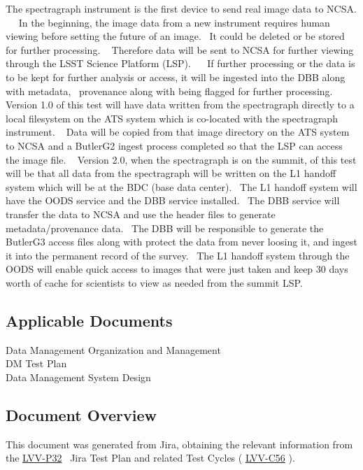 \documentclass[DM,lsstdraft,STR,toc]{lsstdoc}
\begin{document}
The spectragraph instrument is the first device to send real image data
to NCSA. ~ ~In the beginning, the image data from a new instrument
requires human viewing before setting the future of an image. ~It could
be deleted or be stored for further processing. ~ Therefore data will be
sent to NCSA for further viewing through the LSST Science Platform
(LSP). ~ ~If further processing or the data is to be kept for further
analysis or access, it will be ingested into the DBB along with
metadata, ~provenance along with being flagged for further processing. ~
Version 1.0 of this test will have data written from the spectragraph
directly to a local filesystem on the ATS system which is co-located
with the spectragraph instrument. ~ Data will be copied from that image
directory on the ATS system to NCSA and a ButlerG2 ingest process
completed so that the LSP can access the image file. ~ Version 2.0, when
the spectragraph is on the summit, of this test will be that all data
from the spectragraph will be written on the L1 handoff system which
will be at the BDC (base data center). ~The L1 handoff system will have
the OODS service and the DBB service installed. ~The DBB service will
transfer the data to NCSA and use the header files to generate
metadata/provenance data. ~The DBB will be responsible to generate the
ButlerG3 access files along with protect the data from never loosing it,
and ingest it into the permanent record of the survey. ~The L1 handoff
system through the OODS will enable quick access to images that were
just taken and keep 30 days worth of cache for scientists to view as
needed from the summit LSP. ~\\[2\baselineskip]

\subsection{Applicable Documents}\label{applicable-documents}

 Data Management Organization and Management\\
 DM Test Plan\\
 Data Management System Design


\subsection{Document Overview}
\label{sect:docoverview}

This document was generated from Jira, obtaining the relevant information from the 
\href{https://jira.lsstcorp.org/secure/Tests.jspa#/testPlan/LVV-P32}{LVV-P32}
~Jira Test Plan and related Test Cycles (
  \href{https://jira.lsstcorp.org/secure/Tests.jspa#/testCycle/LVV-C56}{LVV-C56}
).
\end{document}
